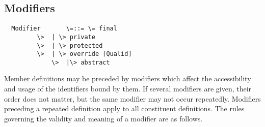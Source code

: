 \documentclass[11pt]{report}
\newcommand{\ifqualified}[1]{}
\begin{document}
\subsection{Modifiers}
\label{sec:modifiers}

\syntax\begin{verbatim}
  Modifier       \=::= \= final
		 \>  | \> private
		 \>  | \> protected
		 \>  | \> override [Qualid]
	         \>  |\> abstract
\end{verbatim}

Member definitions may be preceded by modifiers which
affect the \ifqualified{qualified names, }accessibility and usage of the identifiers
bound by them.  If several modifiers are given, their order does not
matter, but the same modifier may not occur repeatedly.  Modifiers
preceding a repeated definition apply to all constituent definitions.
The rules governing the validity and meaning of a modifier are as
follows.
\end{document}

